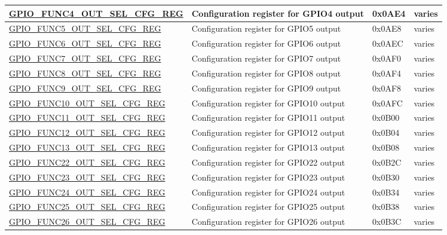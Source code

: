 \begin{longtable}{ | p{5.5cm} | p{6.2cm} | p{1.3cm} | p{2cm} | }
\hyperref[regdesc:GPIOFUNCNOUTSELCFGREG]{GPIO\_FUNC4\_OUT\_SEL\_CFG\_REG} & Configuration register for GPIO4 output & 0x0AE4 & varies \\ \hline
\hyperref[regdesc:GPIOFUNCNOUTSELCFGREG]{GPIO\_FUNC5\_OUT\_SEL\_CFG\_REG} & Configuration register for GPIO5 output & 0x0AE8 & varies \\ \hline
\hyperref[regdesc:GPIOFUNCNOUTSELCFGREG]{GPIO\_FUNC6\_OUT\_SEL\_CFG\_REG} & Configuration register for GPIO6 output & 0x0AEC & varies \\ \hline
\hyperref[regdesc:GPIOFUNCNOUTSELCFGREG]{GPIO\_FUNC7\_OUT\_SEL\_CFG\_REG} & Configuration register for GPIO7 output & 0x0AF0 & varies \\ \hline
\hyperref[regdesc:GPIOFUNCNOUTSELCFGREG]{GPIO\_FUNC8\_OUT\_SEL\_CFG\_REG} & Configuration register for GPIO8 output & 0x0AF4 & varies \\ \hline
\hyperref[regdesc:GPIOFUNCNOUTSELCFGREG]{GPIO\_FUNC9\_OUT\_SEL\_CFG\_REG} & Configuration register for GPIO9 output & 0x0AF8 & varies \\ \hline
\hyperref[regdesc:GPIOFUNCNOUTSELCFGREG]{GPIO\_FUNC10\_OUT\_SEL\_CFG\_REG} & Configuration register for GPIO10 output & 0x0AFC & varies \\ \hline
\hyperref[regdesc:GPIOFUNCNOUTSELCFGREG]{GPIO\_FUNC11\_OUT\_SEL\_CFG\_REG} & Configuration register for GPIO11 output & 0x0B00 & varies \\ \hline
\hyperref[regdesc:GPIOFUNCNOUTSELCFGREG]{GPIO\_FUNC12\_OUT\_SEL\_CFG\_REG} & Configuration register for GPIO12 output & 0x0B04 & varies \\ \hline
\hyperref[regdesc:GPIOFUNCNOUTSELCFGREG]{GPIO\_FUNC13\_OUT\_SEL\_CFG\_REG} & Configuration register for GPIO13 output & 0x0B08 & varies \\ \hline
\hyperref[regdesc:GPIOFUNCNOUTSELCFGREG]{GPIO\_FUNC22\_OUT\_SEL\_CFG\_REG} & Configuration register for GPIO22 output & 0x0B2C & varies \\ \hline
\hyperref[regdesc:GPIOFUNCNOUTSELCFGREG]{GPIO\_FUNC23\_OUT\_SEL\_CFG\_REG} & Configuration register for GPIO23 output & 0x0B30 & varies \\ \hline
\hyperref[regdesc:GPIOFUNCNOUTSELCFGREG]{GPIO\_FUNC24\_OUT\_SEL\_CFG\_REG} & Configuration register for GPIO24 output & 0x0B34 & varies \\ \hline
\hyperref[regdesc:GPIOFUNCNOUTSELCFGREG]{GPIO\_FUNC25\_OUT\_SEL\_CFG\_REG} & Configuration register for GPIO25 output & 0x0B38 & varies \\ \hline
\hyperref[regdesc:GPIOFUNCNOUTSELCFGREG]{GPIO\_FUNC26\_OUT\_SEL\_CFG\_REG} & Configuration register for GPIO26 output & 0x0B3C & varies \\ \hline

\end{longtable}
